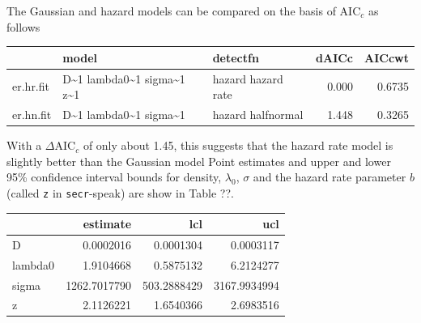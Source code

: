 The Gaussian and hazard models can be compared on the basis of AIC$_c$ as follows
{\small
\begin{knitrout}
\color{fgcolor}\begin{kframe}
\begin{alltt}
 \hlkwb{<-} 
\hlopt{::}\hlstd{(aics[,}\hlstd{(}\hlstd{,}\hlstd{,}\hlstd{,}\hlstd{)])}
\end{alltt}
\end{kframe}
\begin{tabular}{l|l|l|r|r}
\hline
  & model & detectfn & dAICc & AICcwt\\
\hline
er.hr.fit & D\textasciitilde{}1 lambda0\textasciitilde{}1 sigma\textasciitilde{}1 z\textasciitilde{}1 & hazard hazard rate & 0.000 & 0.6735\\
\hline
er.hn.fit & D\textasciitilde{}1 lambda0\textasciitilde{}1 sigma\textasciitilde{}1 & hazard halfnormal & 1.448 & 0.3265\\
\hline
\end{tabular}


\end{knitrout}
}
\noindent
With a $\Delta$AIC$_c$ of only about 1.45, this suggests that the hazard rate model is slightly better than the Gaussian model Point estimates and upper and lower 95\% confidence interval bounds for density, $\lambda_0$, $\sigma$ and the hazard rate parameter $b$ (called \texttt{z} in \texttt{secr}-speak) are show in Table ??.

{\small
\begin{knitrout}
\color{fgcolor}\begin{kframe}
\begin{alltt}
\hlopt{::}\hlstd{(}\hlstd{(er.hr.fit)[,}\hlstd{(}\hlstd{,}\hlstd{,}\hlstd{)])}
\end{alltt}
\end{kframe}
\begin{tabular}{l|r|r|r}
\hline
  & estimate & lcl & ucl\\
\hline
D & 0.0002016 & 0.0001304 & 0.0003117\\
\hline
lambda0 & 1.9104668 & 0.5875132 & 6.2124277\\
\hline
sigma & 1262.7017790 & 503.2888429 & 3167.9934994\\
\hline
z & 2.1126221 & 1.6540366 & 2.6983516\\
\hline
\end{tabular}


\end{knitrout}
} 


